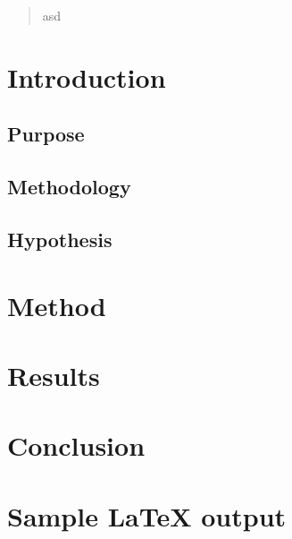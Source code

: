 \documentclass[twocolumn]{article}
\begin{document}
\pagestyle{fancy}
\fancyfoot[c]{}

\onecolumn
\begin{abstract}
asd
\end{abstract}
\clearpage

\tableofcontents
\clearpage
\setcounter{page}{1}
\fancyfoot[c]{\thepage}
\twocolumn


\section{Introduction}

\subsection{Purpose}
\subsection{Methodology}
\subsection{Hypothesis}

\section{Method}

\section{Results}

\section{Conclusion}


\onecolumn
\appendix
\section{Sample LaTeX output}
\end{document}
